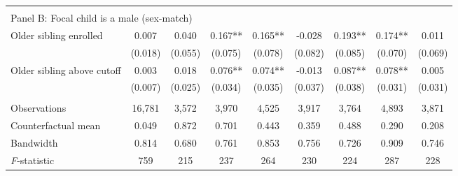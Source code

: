 {{\begin{tabular}{lcccccccc}
&  &  &  & & & & & \\
\multicolumn{10}{l}{Panel B: Focal child is a male (sex-match)} \\
Older sibling enrolled&       0.007   &       0.040   &       0.167** &       0.165** &      -0.028   &       0.193** &       0.174** &       0.011   \\
                    &     (0.018)   &     (0.055)   &     (0.075)   &     (0.078)   &     (0.082)   &     (0.085)   &     (0.070)   &     (0.069)   \\
 
Older sibling above cutoff&       0.003   &       0.018   &       0.076** &       0.074** &      -0.013   &       0.087** &       0.078** &       0.005   \\
                    &     (0.007)   &     (0.025)   &     (0.034)   &     (0.035)   &     (0.037)   &     (0.038)   &     (0.031)   &     (0.031)   \\
                    &               &               &               &               &               &               &               &               \\
Observations        &      16,781   &       3,572   &       3,970   &       4,525   &       3,917   &       3,764   &       4,893   &       3,871   \\
Counterfactual mean &       0.049   &       0.872   &       0.701   &       0.443   &       0.359   &       0.488   &       0.290   &       0.208   \\
Bandwidth           &       0.814   &       0.680   &       0.761   &       0.853   &       0.756   &       0.726   &       0.909   &       0.746   \\
\textit{F}-statistic&         759   &         215   &         237   &         264   &         230   &         224   &         287   &         228   \\
 

\bottomrule
\end{tabular}
}
}

